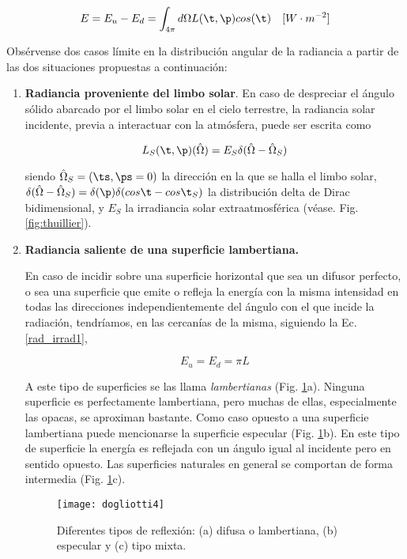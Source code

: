 \begin{equation}
 E=E_{u}-E_{d}=\int_{4\pi}d\Omega L(\t,\p)cos(\t)\quad [W\cdot m^{-2}]
\label{rad_irrad2}
 \end{equation}

Obsérvense dos casos límite en la distribución angular de la radiancia a partir de las dos situaciones propuestas a continuación: 

\begin{enumerate}
\item \textbf{Radiancia proveniente del limbo solar}. En caso de despreciar el ángulo sólido abarcado por el limbo solar en el cielo terrestre, la radiancia solar incidente, previa a interactuar con la atmósfera, puede ser escrita como

\begin{equation}
L_{S}(\t,\p)(\hat{\Omega})=E_{S}\delta(\hat{\Omega}-\hat{\Omega}_{S})
\label{limbosolar}
 \end{equation}

siendo $\hat{\Omega}_{S}=(\ts, \ps=0)$ la dirección en la que se halla el limbo solar, $\delta(\hat{\Omega}-\hat{\Omega}_{S})=\delta(\p)\delta(cos \t - cos \t_{S})$ la distribución delta de Dirac bidimensional, y $E_{S}$ la irradiancia solar extraatmosférica (véase. Fig. \ref{fig:thuillier}).

\item \textbf{Radiancia saliente de una superficie lambertiana.}

En caso de incidir sobre una superficie horizontal que sea un difusor perfecto,
o sea una superficie que emite o refleja la
energía con la misma intensidad en todas las direcciones independientemente del
ángulo con el que incide la radiación, tendríamos, en las cercanías de la misma, siguiendo la Ec. \eqref{rad_irrad1},

\begin{equation}
 E_{u}=E_{d}=\pi L
\label{superficielambertiana}
 \end{equation}

A este tipo de superficies se las llama \textit{lambertianas} (Fig. \ref{fig:dogliotti4}a). 
Ninguna superficie es perfectamente lambertiana, pero muchas de ellas, especialmente las opacas, se aproximan bastante. Como caso opuesto a una superficie lambertiana puede mencionarse la superficie especular (Fig. \ref{fig:dogliotti4}b). En este tipo de superficie la energía es reflejada con un ángulo igual al incidente pero en sentido opuesto. Las superficies naturales en general se comportan de forma intermedia (Fig. \ref{fig:dogliotti4}c).

\begin{figure}[H]
\centering
\texttt{[image: dogliotti4]}
\caption[Tipos de superficies reflectoras]{Diferentes tipos de reflexión: (a) difusa o lambertiana, (b) especular y (c) tipo mixta.} 
\label{fig:dogliotti4}
\end{figure}
\end{enumerate}

